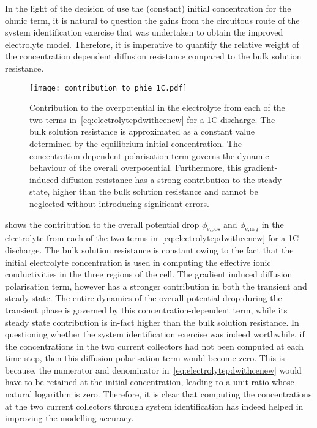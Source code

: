 In the light of the decision of use the (constant) initial concentration for the
ohmic term, it is natural to question the gains from the circuitous route of the
system  identification  exercise that  was  undertaken  to obtain  the  improved
electrolyte model. Therefore,  it is imperative to quantify  the relative weight
of  the  concentration  dependent  diffusion resistance  compared  to  the  bulk
solution resistance.

\begin{figure}[!htbp]
    \centering
    \texttt{[image: contribution\_to\_phie\_1C.pdf]}
    \caption[%
    Contribution to electrolyte overpotential from the gradient-induced polarisation
    term and the bulk solution resistance term for a 1C discharge
    ]%
    {%
        Contribution to the overpotential in the electrolyte from each of the
        two terms in~\cref{eq:electrolytepdwithcenew} for a 1C discharge. The
        bulk solution resistance is approximated as a constant value determined
        by the equilibrium initial concentration. The concentration dependent
        polarisation term governs the dynamic behaviour of the overall
        overpotential. Furthermore, this gradient-induced diffusion resistance
        has a strong contribution to the steady state, higher than the bulk
        solution resistance and cannot be neglected without introducing
        significant errors.
}%
\label{fig:contributiontophiefromtwoterms}
\end{figure}

 shows the  contribution to the overall
potential drop  $\phi_\text{e,pos}$ and  $\phi_\text{e,neg}$ in  the electrolyte
from  each  of  the  two  terms  in~\cref{eq:electrolytepdwithcenew}  for  a  1C
discharge. The bulk  solution resistance is constant owing to  the fact that the
initial  electrolyte concentration  is  used in  computing  the effective  ionic
conductivities in the three regions of  the cell. The gradient induced diffusion
polarisation term, however has a stronger contribution in both the transient and
steady  state. The  entire dynamics  of the  overall potential  drop during  the
transient  phase is  governed by  this concentration-dependent  term, while  its
steady state contribution  is in-fact higher than the  bulk solution resistance.
In questioning whether the system identification exercise was indeed worthwhile,
if the  concentrations in the  two current collectors  had not been  computed at
each time-step, then this diffusion polarisation term would become zero. This is
because, the numerator and denominator in~\cref{eq:electrolytepdwithcenew} would
have  to be  retained at  the  initial concentration,  leading to  a unit  ratio
whose  natural logarithm  is zero.  Therefore, it  is clear  that computing  the
concentrations at the  two current collectors through  system identification has
indeed helped in improving the modelling accuracy.

